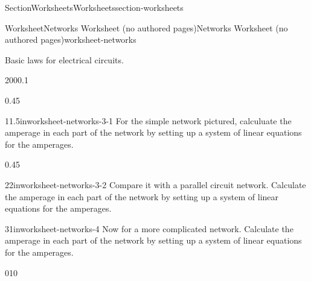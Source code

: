 \documentclass[oneside,10pt,]{article}
\numberwithin{equation}{section}
\begin{document}
\begin{sectionptx}{Section}{Worksheets}{}{Worksheets}{}{}{section-worksheets}
\begin{worksheet-subsection}{Worksheet}{Networks Worksheet (no authored pages)}{}{Networks Worksheet (no authored pages)}{}{}{worksheet-networks}
\begin{introduction}{Basic laws for electrical circuits.}
\end{introduction}%
\begin{sidebyside}{2}{0}{0}{0.1}%
\begin{sbspanel}{0.45}%
\begin{divisionexercise}{1}{}{1.5in}{worksheet-networks-3-1}%
For the simple network pictured, calculuate the amperage in each part of the network by setting up a system of linear equations for the amperages.%
\noindent{}%
\end{divisionexercise}%
\end{sbspanel}%
\begin{sbspanel}{0.45}%
\begin{divisionexercise}{2}{}{2in}{worksheet-networks-3-2}%
Compare it with a parallel circuit network. Calculate the amperage in each part of the network by setting up a system of linear equations for the amperages.%
\noindent{}%
\end{divisionexercise}%
\end{sbspanel}%
\end{sidebyside}%
\begin{divisionexercise}{3}{}{1in}{worksheet-networks-4}%
Now for a more complicated network. Calculate the amperage in each part of the network by setting up a system of linear equations for the amperages.%
\begin{image}{0}{1}{0}{}%
\end{image}
\end{divisionexercise}
\end{worksheet-subsection}
\end{sectionptx}
\end{document}

